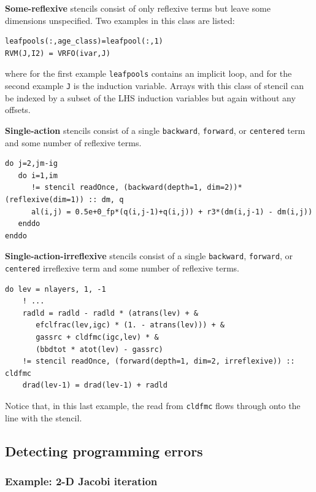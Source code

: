 \documentclass[9pt]{sigplanconf}
\theoremstyle{definition}
\newcommand{\term}[1]{\texttt{#1}}
\begin{document}
\textbf{Some-reflexive} stencils consist of only reflexive terms but
leave some dimensions unspecified. Two examples in this class are listed:
\begin{verbatim}
leafpools(:,age_class)=leafpool(:,1)
RVM(J,I2) = VRFO(ivar,J)
\end{verbatim}
where for the first example \texttt{leafpools} contains an
implicit loop, and for the second example \texttt{J} is
the induction variable. Arrays with this class of stencil can be
indexed by a subset of the LHS induction variables but again without
any offsets.

\textbf{Single-action} stencils consist of a single \term{backward},
\term{forward}, or \term{centered} term and some number of reflexive
terms.
\begin{verbatim}
do j=2,jm-ig
   do i=1,im
      != stencil readOnce, (backward(depth=1, dim=2))*(reflexive(dim=1)) :: dm, q
      al(i,j) = 0.5e+0_fp*(q(i,j-1)+q(i,j)) + r3*(dm(i,j-1) - dm(i,j))
   enddo
enddo
\end{verbatim}

\textbf{Single-action-irreflexive} stencils consist of a single
\term{backward}, \term{forward}, or \term{centered} irreflexive term
and some number of reflexive terms.
\begin{verbatim}
do lev = nlayers, 1, -1
    ! ...
    radld = radld - radld * (atrans(lev) + &
       efclfrac(lev,igc) * (1. - atrans(lev))) + &
       gassrc + cldfmc(igc,lev) * &
       (bbdtot * atot(lev) - gassrc)
    != stencil readOnce, (forward(depth=1, dim=2, irreflexive)) :: cldfmc
    drad(lev-1) = drad(lev-1) + radld
\end{verbatim}
Notice that, in this last example, the read from
\texttt{cldfmc} flows through onto the line with the
stencil.


\subsection{Detecting programming errors}

\subsubsection{Example: 2-D Jacobi iteration}
\end{document}
